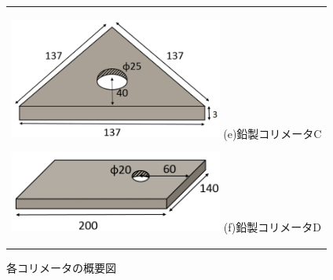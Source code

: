 \begin{figure}[H]
	\centering
		\begin{tabular}{c}
			\begin{minipage}[t]{0.5\hsize}
				\centering
					\includegraphics[width=70mm]{fig/isb/leadcollimator2.png}
					\hspace{1.6cm} (e)鉛製コリメータC
			\end{minipage}
			\begin{minipage}[t]{0.5\hsize}
				\centering
					\includegraphics[width=70mm]{fig/isb/leadcollimator1.png}
					\hspace{1.6cm} (f)鉛製コリメータD
			\end{minipage}
		\end{tabular}
		\caption{各コリメータの概要図}
		\label{collimators}
\end{figure}
\newpage
